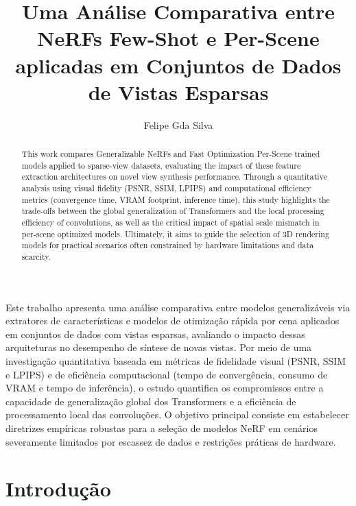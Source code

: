 \documentclass[12pt]{article}
\title{Uma Análise Comparativa entre NeRFs Few-Shot e Per-Scene aplicadas em Conjuntos de Dados de Vistas Esparsas}
\author{Felipe Gda Silva\inst{1}}
\begin{document}
 
\maketitle
\begin{abstract}
This work compares Generalizable NeRFs and Fast Optimization Per-Scene trained models applied to sparse-view datasets, evaluating the impact of these feature extraction architectures on novel view synthesis performance. Through a quantitative analysis using visual fidelity (PSNR, SSIM, LPIPS) and computational efficiency metrics (convergence time, VRAM footprint, inference time), this study highlights the trade-offs between the global generalization of Transformers and the local processing efficiency of convolutions, as well as the critical impact of spatial scale mismatch in per-scene optimized models. Ultimately, it aims to guide the selection of 3D rendering models for practical scenarios often constrained by hardware limitations and data scarcity.
\end{abstract}

\begin{resumo}
  Este trabalho apresenta uma análise comparativa entre modelos generalizáveis via extratores de características e modelos de otimização rápida por cena aplicados em conjuntos de dados com vistas esparsas, avaliando o impacto dessas arquiteturas no desempenho de síntese de novas vistas. Por meio de uma investigação quantitativa baseada em métricas de fidelidade visual (PSNR, SSIM e LPIPS) e de eficiência computacional (tempo de convergência, consumo de VRAM e tempo de inferência), o estudo quantifica os compromissos entre a capacidade de generalização global dos Transformers e a eficiência de processamento local das convoluções. O objetivo principal consiste em estabelecer diretrizes empíricas robustas para a seleção de modelos NeRF em cenários severamente limitados por escassez de dados e restrições práticas de hardware.
\end{resumo}

\section{Introdução}
\label{sec:intro}
\end{document}
